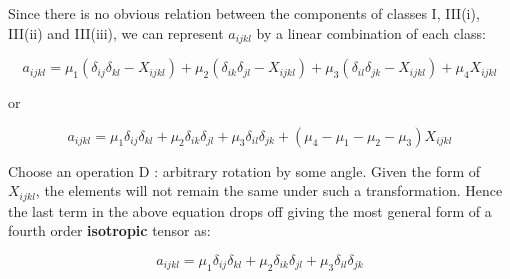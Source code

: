 Since there is no obvious relation between the components of classes I, III(i), III(ii) and III(iii), we can represent $a_{ijkl}$ by a linear combination of each class:

$$ a_{ijkl} = \mu_1 (\delta_{ij} \delta_{kl} - X_{ijkl} ) + \mu_2 (\delta_{ik} \delta_{jl} - X_{ijkl}) + \mu_3
(\delta_{il} \delta_{jk} - X_{ijkl} ) + \mu_4 X_{ijkl} $$

or

$$ a_{ijkl} = \mu_1 \delta_{ij} \delta_{kl}  + \mu_2 \delta_{ik} \delta_{jl} + \mu_3
\delta_{il} \delta_{jk}  + ( \mu_4 - \mu_1 - \mu_2 - \mu_3 ) X_{ijkl} $$

Choose an operation D : arbitrary rotation by some angle. Given the form of $X_{ijkl}$, the elements will not remain the same under such a transformation. Hence the last term in the above equation drops off giving the most general form of a fourth order {\bf isotropic} tensor as:


$$ a_{ijkl} = \mu_1 \delta_{ij} \delta_{kl}  + \mu_2 \delta_{ik} \delta_{jl} + \mu_3 \delta_{il} \delta_{jk}  $$



